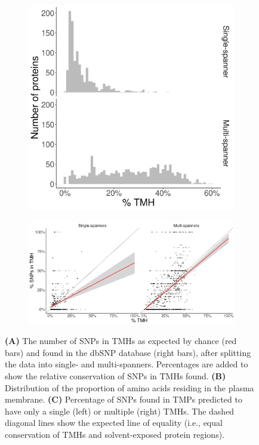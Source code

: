 \begin{figure}
\begin{subfigure}[t]{0.45\textwidth}
    \includegraphics[width=\linewidth]{ncbi_peregrine_results/fig_f_tmh_ncbi_per_spanner.png}
    \label{fig:f_tmh_ncbi_per_spanner}
  \end{subfigure}  

  \vfill
  
  \begin{subfigure}[t]{\textwidth}
    \centering
    \caption{}
    \includegraphics[width=\linewidth]{ncbi_peregrine_results/fig_f_snps_found_and_expected_per_spanner.png}
    \label{fig:f_snps_found_and_expected_per_spanner}
  \end{subfigure}
  \caption{
      \textbf{(A)} 
      The number of SNPs in TMHs as expected by chance (red bars) 
      and found in the dbSNP database (right bars), 
      after splitting the data into single- and multi-spanners.
      Percentages are added to show the relative conservation
      of SNPs in TMHs found.
      \textbf{(B)} 
      Distribution of the proportion of amino acids residing
      in the plasma membrane.
      \textbf{(C)} 
      Percentage of SNPs found in TMPs predicted to have only a single
      (left) or multiple (right) TMHs.
      The dashed diagonal lines show the expected line of equality 
      (i.e., equal conservation of TMHs and solvent-exposed 
      protein regions).
  }
\end{figure}

